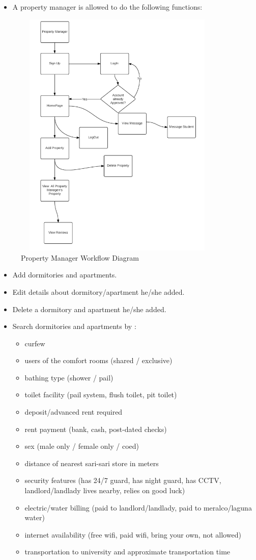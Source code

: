 \documentclass[journal]{./IEEE/IEEEtran}
\begin{document}
\begin{enumerate}
\begin{itemize}
		\item A property manager is allowed to do the following functions:
		\end{itemize}
			\begin{figure} 
			\centering
			\includegraphics[width=10cm,height=12cm]{images/property.png}
			\caption{Property Manager Workflow Diagram}
			\end{figure}
			\begin{itemize}
				\item Add dormitories and apartments.
				\item Edit details about dormitory/apartment he/she added.
				\item Delete a dormitory and apartment he/she added.
				\item Search dormitories and apartments by :
					\begin{itemize}
						\item curfew
						\item users of the comfort rooms (shared / exclusive)
						\item bathing type (shower / pail)
						\item toilet facility (pail system, flush toilet, pit toilet) 
						\item deposit/advanced rent required
						\item rent payment (bank, cash, post-dated checks)
						\item sex (male only / female only / coed)
						\item distance of nearest sari-sari store in meters
						\item security features (has 24/7 guard, has night guard, has CCTV, landlord/landlady lives nearby, relies on good luck)
						\item electric/water billing (paid to landlord/landlady, paid to meralco/laguna water)
						\item internet availability (free wifi, paid wifi, bring your own, not allowed)
						\item transportation to university and approximate transportation time


\end{itemize}
\end{itemize}
\end{enumerate}
\end{document}
